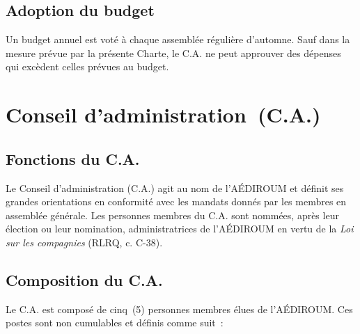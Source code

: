 \documentclass{aediroum}
\begin{document}
\subsection{Adoption du budget}\label{sec:adoption-budget}

Un budget annuel est voté à chaque assemblée régulière d'automne. Sauf dans la mesure prévue par la présente Charte, le C.A. ne peut approuver des dépenses qui excèdent celles prévues au budget.

\section{Conseil d’administration~(C.A.)}\label{sec:conseil-executif-et-conseil-dadministration}

\subsection{Fonctions du C.A.}\label{sec:fonctions-du-conseil-executif}

Le Conseil d'administration (C.A.) agit au nom de l’AÉDIROUM et définit ses grandes orientations en conformité avec les mandats donnés par les membres en assemblée générale.
Les personnes membres du C.A. sont nommées, après leur élection ou leur nomination, administratrices de l'AÉDIROUM en vertu de la \textit{Loi sur les compagnies} (RLRQ, c. C-38).

\subsection{Composition du C.A.}\label{sec:composition-du-conseil-executif}

Le C.A. est composé de cinq~(5) personnes membres élues de l'AÉDIROUM. Ces postes sont non cumulables et définis comme suit~:
\end{document}

